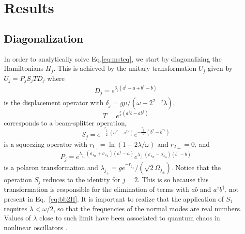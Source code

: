 \documentclass[%
reprint,
amsmath,amssymb,
aps,
pra,
]{revtex4-1}
\begin{document}
\section{\label{sec:res}Results}
\subsection{\label{subsec:diag}Diagonalization}
In order to  analytically solve Eq.\eqref{eq:msteq}, we start by diagonalizing the Hamiltonians $H_j$. This is achieved by the unitary transformation $U_j$ given by $U_j=P_jS_jTD_j$ where
\begin{eqnarray}
D_j=e^{\delta_j\left(a^{\dagger}-a+b^{\dagger}-b\right)}
\end{eqnarray}
is the displacement operator with $\delta_j=g\mu/\left(\omega+2^{2-j}\lambda\right)$,
\begin{equation}
T=e^{\frac{\pi}{4}\left(a^{\dagger}b-ab^{\dagger}\right)}
\label{eq:t2}
\end{equation}
corresponds to a beam-splitter operation,
\begin{equation}S_j=e^{-\frac{r_{j_+}}{2}\left(a^2-a^{\dagger 2}\right)}e^{-\frac{r_{j_-}}{2}\left(b^2-b^{\dagger 2}\right)}
\label{eq:t3}
\end{equation}
is a squeezing operator with $r_{1_{\pm}}=\ln\left(1\pm 2\lambda/\omega\right)$ and $r_{2\pm}=0$, and
\begin{equation}
P_j=e^{\lambda_{j_+}\left(\sigma_{z_B}+\sigma_{z_A}\right)\left(a^{\dagger}-a\right)}e^{\lambda_{j_-}\left(\sigma_{z_B}-\sigma_{z_A}\right)\left(b^{\dagger}-b\right)}
\label{eq:t4}
\end{equation}
is a polaron transformation \cite{pol} and $\lambda_{j_\pm}=g e^{-r_{j_\pm}}/(\sqrt{2}\Omega_{j_\pm})$. Notice that the operation $S_j$ reduces to the identity for $j=2$. This is so because this transformation is responsible for the elimination of terms with $ab$ and $a^{\dagger}b^{\dagger}$, not present in Eq.~\eqref{eq:bb2H}. It is important to realize that the application of $S_1$ requires $\lambda<\omega/2$, so that the frequencies of the normal modes are real numbers. Values of $\lambda$ close to such limit have been associated to quantum chaos in nonlinear oscillators \cite{zue14}. 
\end{document}
